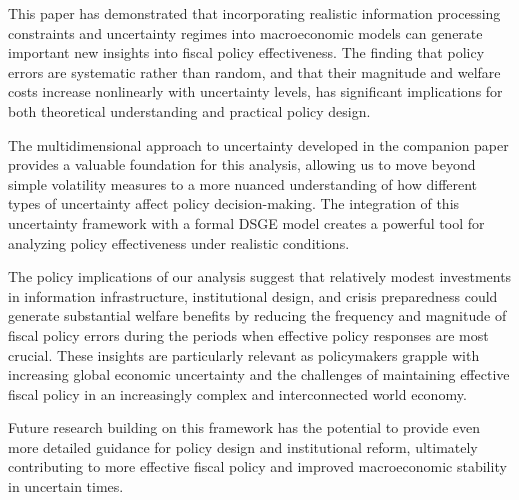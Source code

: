 \documentclass[5p,authoryear]{elsarticle}
\begin{document}
This paper has demonstrated that incorporating realistic information processing constraints and uncertainty regimes into macroeconomic models can generate important new insights into fiscal policy effectiveness. The finding that policy errors are systematic rather than random, and that their magnitude and welfare costs increase nonlinearly with uncertainty levels, has significant implications for both theoretical understanding and practical policy design.

The multidimensional approach to uncertainty developed in the companion paper provides a valuable foundation for this analysis, allowing us to move beyond simple volatility measures to a more nuanced understanding of how different types of uncertainty affect policy decision-making. The integration of this uncertainty framework with a formal DSGE model creates a powerful tool for analyzing policy effectiveness under realistic conditions.

The policy implications of our analysis suggest that relatively modest investments in information infrastructure, institutional design, and crisis preparedness could generate substantial welfare benefits by reducing the frequency and magnitude of fiscal policy errors during the periods when effective policy responses are most crucial. These insights are particularly relevant as policymakers grapple with increasing global economic uncertainty and the challenges of maintaining effective fiscal policy in an increasingly complex and interconnected world economy.

Future research building on this framework has the potential to provide even more detailed guidance for policy design and institutional reform, ultimately contributing to more effective fiscal policy and improved macroeconomic stability in uncertain times.





\end{document}
